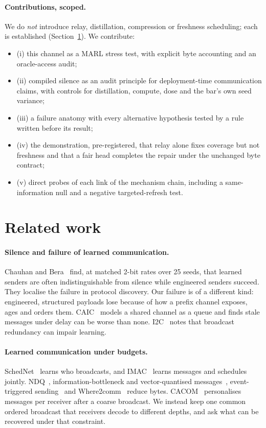 \documentclass[11pt]{article}
\theoremstyle{definition}
\begin{document}
\paragraph{Contributions, scoped.}
We do \emph{not} introduce relay, distillation, compression or freshness scheduling; each is established
(Section~\ref{sec:related}). We contribute:
\begin{itemize}
\item (i) this channel as a MARL stress test, with explicit byte accounting and an oracle-access audit;
\item (ii) compiled silence as an audit principle for deployment-time communication claims, with controls for
distillation, compute, dose and the bar's own seed variance;
\item (iii) a failure anatomy with every alternative hypothesis tested by a rule written before its result;
\item (iv) the demonstration, pre-registered, that relay alone fixes coverage but not freshness and that a fair head
completes the repair under the unchanged byte contract;
\item (v) direct probes of each link of the mechanism chain, including a same-information null and a negative
targeted-refresh test.
\end{itemize}

\section{Related work}\label{sec:related}
\paragraph{Silence and failure of learned communication.} Chauhan and Bera~\cite{chauhan2026} find, at matched 2-bit
rates over 25 seeds, that learned senders are often indistinguishable from silence while engineered senders succeed.
They localise the failure in protocol discovery. Our failure is of a different kind: engineered, structured payloads
lose because of how a prefix channel exposes, ages and orders them. CAIC~\cite{caic} models a shared channel as a
queue and finds stale messages under delay can be worse than none. I2C~\cite{i2c} notes that broadcast redundancy can
impair learning.
\paragraph{Learned communication under budgets.} SchedNet~\cite{schednet} learns who broadcasts, and
IMAC~\cite{imac} learns messages and schedules jointly. NDQ~\cite{ndq}, information-bottleneck and vector-quantised
messages~\cite{ibvq}, event-triggered sending~\cite{etcnet} and Where2comm~\cite{where2comm} reduce bytes.
CACOM~\cite{cacom} personalises messages per receiver after a coarse broadcast. We instead keep one common ordered
broadcast that receivers decode to different depths, and ask what can be recovered under that constraint.
\end{document}
